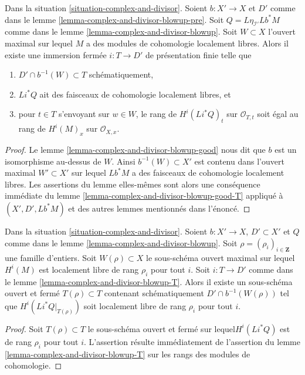 \begin{lemma}
\label{lemma-complex-and-divisor-blowup-T}
Dans la situation \ref{situation-complex-and-divisor}. Soient $b : X' \to X$
et $D'$ comme dans le lemme \ref{lemma-complex-and-divisor-blowup-pre}. Soit
$Q = L\eta_{\mathcal{I}'}Lb^*M$ comme dans le
lemme \ref{lemma-complex-and-divisor-blowup}.
Soit $W \subset X$ l'ouvert maximal sur lequel $M$ a des
modules de cohomologie localement libres.
Alors il existe une immersion fermée $i : T \to D'$ de présentation finie
telle que
\begin{enumerate}
\item $D' \cap b^{-1}(W) \subset T$ schématiquement,
\item $Li^*Q$ ait des faisceaux de cohomologie localement libres, et
\item pour $t \in T$ s'envoyant sur $w \in W$, le rang
de $H^i(Li^*Q)_t$ sur $\mathcal{O}_{T, t}$ soit égal au
rang de $H^i(M)_x$ sur $\mathcal{O}_{X, x}$.
\end{enumerate}
\end{lemma}

\begin{proof}
Le lemme \ref{lemma-complex-and-divisor-blowup-good} nous dit que
$b$ est un isomorphisme au-dessus de $W$. Ainsi $b^{-1}(W) \subset X'$
est contenu dans l'ouvert maximal $W' \subset X'$ sur lequel $Lb^*M$
a des faisceaux de cohomologie localement libres. Les assertions du lemme elles-mêmes
sont alors une conséquence immédiate du
lemme \ref{lemma-complex-and-divisor-blowup-good-T} appliqué
à $(X', D', Lb^*M)$ et des autres lemmes mentionnés dans l'énoncé.
\end{proof}

\begin{lemma}
\label{lemma-complex-and-divisor-blowup-T-ranks}
Dans la situation \ref{situation-complex-and-divisor}. Soient $b : X' \to X$,
$D' \subset X'$ et $Q$ comme dans le
lemme \ref{lemma-complex-and-divisor-blowup}.
Soit $\rho = (\rho_i)_{i \in \mathbf{Z}}$ une famille d'entiers.
Soit $W(\rho) \subset X$ le sous-schéma ouvert maximal sur lequel
$H^i(M)$ est localement libre de rang $\rho_i$ pour tout $i$.
Soit $i : T \to D'$ comme dans le lemme \ref{lemma-complex-and-divisor-blowup-T}.
Alors il existe un sous-schéma ouvert et fermé $T(\rho) \subset T$
contenant schématiquement $D' \cap b^{-1}(W(\rho))$
tel que $H^i(Li^*Q|_{T(\rho)})$ soit localement libre de rang $\rho_i$
pour tout $i$.
\end{lemma}

\begin{proof}
Soit $T(\rho) \subset T$ le sous-schéma ouvert et fermé
sur lequel\newline $H^i(Li^*Q)$ est de rang $\rho_i$ pour tout $i$. L'assertion
résulte immédiatement de l'assertion du
lemme \ref{lemma-complex-and-divisor-blowup-T}
sur les rangs des modules de cohomologie.
\end{proof}

